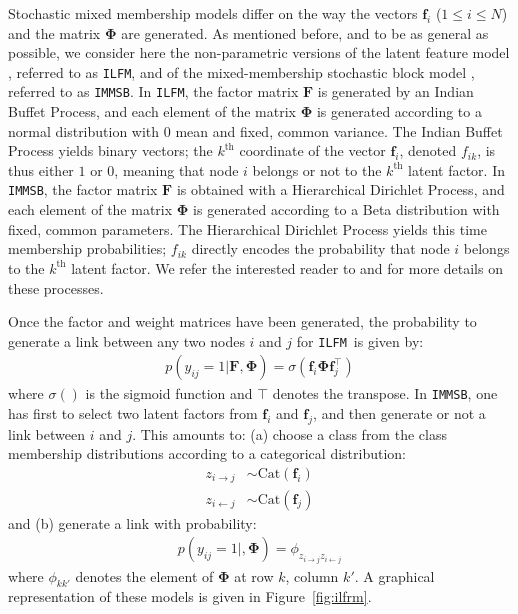 \documentclass[9pt,twocolumn,twoside]{pnas-new}
\newcommand{\ifm}{\texttt{ILFM}}
\newcommand{\imb}{\texttt{IMMSB}}
\newcommand{\mat}[1]{\mathbf{#1}}
\begin{document}
Stochastic mixed membership models differ on the way the vectors $\mat{f}_{i}$ ($1 \le i \le N$) and the matrix $\mat{\Phi}$ are generated. As mentioned before, and to be as general as possible, we consider here the non-parametric versions of the latent feature model \cite{ILFRM}, referred to as \ifm, and of the mixed-membership stochastic block model \cite{iMMSB,diMMSB}, referred to as \imb. In \ifm, the factor matrix $\mat{F}$ is generated by an Indian Buffet Process, and each element of the matrix $\mat{\Phi}$ is generated according to a normal distribution with 0 mean and fixed, common variance. The Indian Buffet Process yields binary vectors; the $k^{\mbox{th}}$ coordinate of the vector $\mat{f}_{i}$, denoted $f_{ik}$, is thus either $1$ or $0$, meaning that node $i$ belongs or not to the $k^{\mbox{th}}$ latent factor. In \imb, the factor matrix $\mat{F}$ is obtained with a Hierarchical  Dirichlet Process, and each element of the matrix $\mat{\Phi}$ is generated according to a Beta distribution with fixed, common parameters. The Hierarchical  Dirichlet Process yields this time membership probabilities; $f_{ik}$ directly encodes the probability that node $i$ belongs to the $k^{\mbox{th}}$ latent factor. We refer the interested reader to \cite{ILFRM} and \cite{iMMSB} for more details on these processes.

Once the factor and weight matrices have been generated, the probability to generate a link between any two nodes $i$ and $j$ for \ifm\ is given by:
%
\begin{align}
p(y_{ij}=1|\mat{F},\mat{\Phi}) = \sigma(\mat{f}_{i} \mat{\Phi} \mat{f}_{j}^\top)
\label{eq:ilfm}
\end{align}
%
where $\sigma()$ is the sigmoid function and $\top$ denotes the transpose. In \imb, one has first to select two latent factors from $\mat{f}_i$ and $\mat{f}_j$, and then generate or not a link between $i$ and $j$. This amounts to: (a) choose a class from the class membership distributions according to a categorical distribution:
%
\begin{align}
 z_{i \rightarrow j} &\sim \mbox{Cat}(\mat{f}_i) \nonumber \\
 z_{i \leftarrow j} &\sim \mbox{Cat}(\mat{f}_j) \nonumber
\end{align} 
%
and (b) generate a link with probability:
%
\begin{align}
 p(y_{ij}=1|,\mat{\Phi}) = \phi_{z_{i \rightarrow j}z_{i \leftarrow j}}
\label{eq:immsb}
\end{align}
%
where $\phi_{kk'}$ denotes the element of $\mat{\Phi}$ at row $k$, column $k'$.
%
A graphical representation of these models is given in Figure~\ref{fig:ilfrm}.
\end{document}
